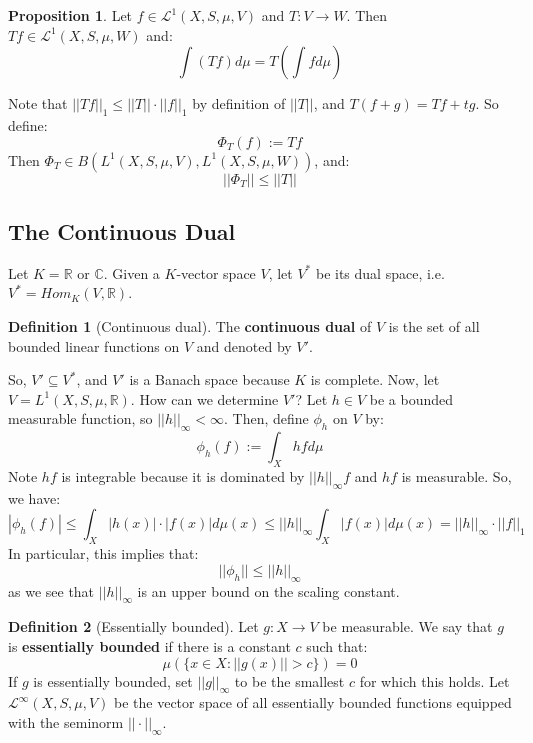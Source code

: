 \documentclass[11pt, oneside]{amsart}   	%
\theoremstyle{definition}
\newtheorem{definition}{Definition}[section]
\newtheorem{prop}{Proposition}[section]
\begin{document}
	\begin{prop}
		Let $f\in\mathcal L^1(X, S, \mu, V)$ and $T : V\rightarrow W$. Then $Tf\in\mathcal L^1(X, S, \mu, W)$ and:
		$$
			\int(Tf)d\mu = T(\int fd\mu)
		$$
	\end{prop}
	
	Note that $||Tf||_1\leq ||T||\cdot ||f||_1$ by definition of $||T||$, and $T(f + g) = Tf + tg$. So define:
	$$
		\Phi_T(f) := Tf
	$$
	Then $\Phi_T\in B(L^1(X, S, \mu, V), L^1(X, S, \mu, W))$, and:
	$$
		||\Phi_T||\leq ||T||
	$$
	
	\subsection{The Continuous Dual}
	
	Let $K = \mathbb R$ or $\mathbb C$. Given a $K$-vector space $V$, let $V^*$ be its dual space, i.e. $V^* = Hom_K(V, 
	\mathbb R)$.
	
	\begin{definition}[Continuous dual]
		The \textbf{continuous dual} of $V$ is the set of all bounded linear functions on $V$ and denoted by $V'$. 
	\end{definition}
	
	So, $V'\subseteq V^*$, and $V'$ is a Banach space because $K$ is complete. Now, let $V = L^1(X, S, \mu, \mathbb R)$. 
	How can we determine $V'$? Let $h\in V$ be a bounded measurable function, so $||h||_\infty < \infty$. Then, define 
	$\phi_h$ on $V$ by:
	$$
		\phi_h(f) := \int_X hfd\mu
	$$
	Note $hf$ is integrable because it is dominated by $||h||_\infty f$ and $hf$ is measurable. So, we have:
	$$
		|\phi_h(f)|\leq\int_X|h(x)|\cdot|f(x)|d\mu(x)\leq ||h||_\infty\int_X|f(x)|d\mu(x) = ||h||_\infty\cdot||f||_1
	$$
	In particular, this implies that:
	$$
		||\phi_h||\leq ||h||_\infty
	$$
	as we see that $||h||_\infty$ is an upper bound on the scaling constant.
	
	\begin{definition}[Essentially bounded]
		Let $g : X\rightarrow V$ be measurable. We say that $g$ is \textbf{essentially bounded} if there is a constant $c$ 
		such that:
		$$
			\mu(\{x\in X : ||g(x)|| > c\}) = 0
		$$
		If $g$ is essentially bounded, set $||g||_\infty$ to be the smallest $c$ for which this holds. Let $\mathcal L^\infty(X, 
		S, \mu, V)$ be the vector space of all essentially bounded functions equipped with the seminorm $||\cdot||_\infty$.
	\end{definition}
	
\end{document}
